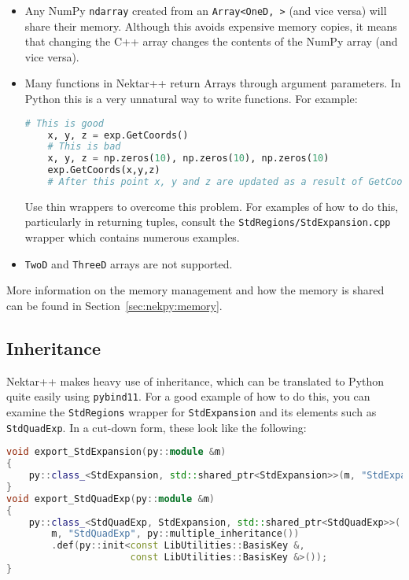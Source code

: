 \begin{itemize}
  \item Any NumPy \texttt{ndarray} created from an \texttt{Array<OneD, >} (and
  vice versa) will share their memory. Although this avoids expensive memory
  copies, it means that changing the C++ array changes the contents of the NumPy
  array (and vice versa).
  \item Many functions in Nektar++ return Arrays through argument parameters. In
  Python this is a very unnatural way to write functions. For example:
  \begin{lstlisting}[language=Python]
    # This is good
    x, y, z = exp.GetCoords()
    # This is bad
    x, y, z = np.zeros(10), np.zeros(10), np.zeros(10)
    exp.GetCoords(x,y,z)
    # After this point x, y and z are updated as a result of GetCoords().
  \end{lstlisting}
  Use thin wrappers to overcome this problem. For examples of how to do this,
  particularly in returning tuples, consult the
  \texttt{StdRegions/StdExpansion.cpp} wrapper which contains numerous examples.
  \item \texttt{TwoD} and \texttt{ThreeD} arrays are not supported.
\end{itemize}

More information on the memory management and how the memory is shared can be
found in Section~\ref{sec:nekpy:memory}.

\subsection{Inheritance}

Nektar++ makes heavy use of inheritance, which can be translated to Python quite
easily using \texttt{pybind11}. For a good example of how to do this, you can
examine the \texttt{StdRegions} wrapper for \texttt{StdExpansion} and its
elements such as \texttt{StdQuadExp}. In a cut-down form, these look like the
following:

\begin{lstlisting}[caption={Inheritance with pybind11}, label={lst:inheritance}, language=C++]
void export_StdExpansion(py::module &m)
{
    py::class_<StdExpansion, std::shared_ptr<StdExpansion>>(m, "StdExpansion");
}
void export_StdQuadExp(py::module &m)
{
    py::class_<StdQuadExp, StdExpansion, std::shared_ptr<StdQuadExp>>(
        m, "StdQuadExp", py::multiple_inheritance())
        .def(py::init<const LibUtilities::BasisKey &,
                      const LibUtilities::BasisKey &>());
}
\end{lstlisting}


